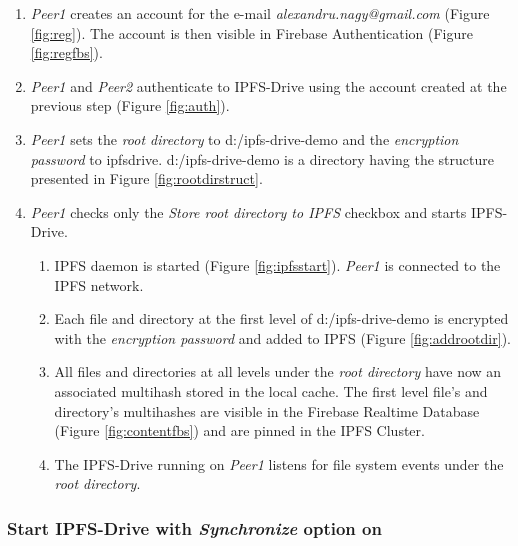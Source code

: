 \documentclass[12pt]{report}
\begin{document}
\begin{enumerate}

\item \textit{Peer1} creates an account for the e-mail \textit{alexandru.nagy@gmail.com} (Figure \ref{fig:reg}). The account is then visible in Firebase Authentication (Figure \ref{fig:regfbs}).

\item \textit{Peer1} and \textit{Peer2} authenticate to IPFS-Drive using the account created at the previous step (Figure \ref{fig:auth}).

\item \textit{Peer1} sets the \textit{root directory} to {\ttfamily d:/ipfs-drive-demo} and the \textit{encryption password} to {\ttfamily ipfsdrive}. {\ttfamily d:/ipfs-drive-demo} is a directory having the structure presented in Figure \ref{fig:rootdirstruct}. 

\item \textit{Peer1} checks only the \textit{Store root directory to IPFS} checkbox and starts IPFS-Drive.

	\begin{enumerate}

	\item IPFS daemon is started (Figure \ref{fig:ipfsstart}). \textit{Peer1} is connected to the IPFS network.

	\item Each file and directory at the first level of {\ttfamily d:/ipfs-drive-demo} is encrypted with the \textit{encryption password} and added to IPFS (Figure 	\ref{fig:addrootdir}).

	\item All files and directories at all levels under the \textit{root directory} have now an associated multihash stored in the local cache. The first level file's and directory's multihashes are visible in the Firebase Realtime Database (Figure \ref{fig:contentfbs}) and are pinned in the IPFS Cluster.

	\item The IPFS-Drive running on \textit{Peer1} listens for file system events under the \textit{root directory}.

	\end{enumerate}

\end{enumerate}

\subsubsection{Start IPFS-Drive with \textit{Synchronize} option on}
\end{document}
